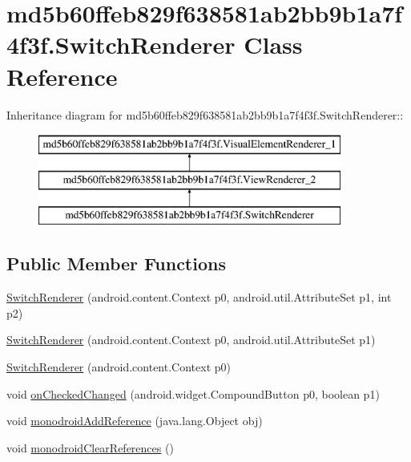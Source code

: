 \hypertarget{classmd5b60ffeb829f638581ab2bb9b1a7f4f3f_1_1_switch_renderer}{
\section{md5b60ffeb829f638581ab2bb9b1a7f4f3f.SwitchRenderer Class Reference}
\label{classmd5b60ffeb829f638581ab2bb9b1a7f4f3f_1_1_switch_renderer}
}
Inheritance diagram for md5b60ffeb829f638581ab2bb9b1a7f4f3f.SwitchRenderer::\begin{figure}[H]
\begin{center}
\leavevmode
\includegraphics[height=3cm]{classmd5b60ffeb829f638581ab2bb9b1a7f4f3f_1_1_switch_renderer}
\end{center}
\end{figure}
\subsection*{Public Member Functions}
\begin{CompactItemize}
\item 
\hyperlink{classmd5b60ffeb829f638581ab2bb9b1a7f4f3f_1_1_switch_renderer_832f5f93ae7ecd3f08aedc1037692738}{SwitchRenderer} (android.content.Context p0, android.util.AttributeSet p1, int p2)
\item 
\hyperlink{classmd5b60ffeb829f638581ab2bb9b1a7f4f3f_1_1_switch_renderer_6aa5634ceb38e4e6ba17fd3174fe2903}{SwitchRenderer} (android.content.Context p0, android.util.AttributeSet p1)
\item 
\hyperlink{classmd5b60ffeb829f638581ab2bb9b1a7f4f3f_1_1_switch_renderer_ecb9a4aa4555f192e24f464151495b5d}{SwitchRenderer} (android.content.Context p0)
\item 
void \hyperlink{classmd5b60ffeb829f638581ab2bb9b1a7f4f3f_1_1_switch_renderer_cb3eb70920f926f8b36888ee849e7ab7}{onCheckedChanged} (android.widget.CompoundButton p0, boolean p1)
\item 
void \hyperlink{classmd5b60ffeb829f638581ab2bb9b1a7f4f3f_1_1_switch_renderer_028e2f4c76a4c1f2172e7e22c873f457}{monodroidAddReference} (java.lang.Object obj)
\item 
void \hyperlink{classmd5b60ffeb829f638581ab2bb9b1a7f4f3f_1_1_switch_renderer_88c5734750b36ec1ff059a1db489262c}{monodroidClearReferences} ()
\end{CompactItemize}
